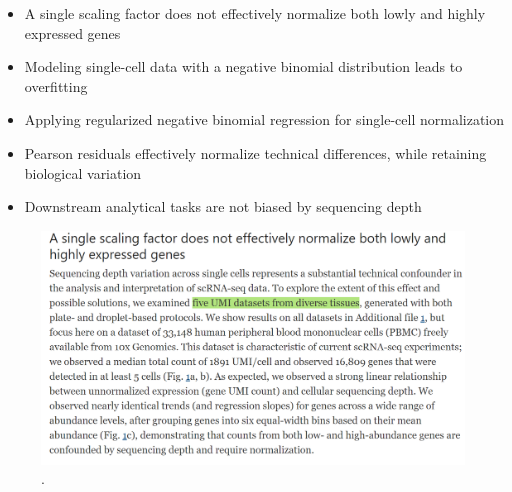 \documentclass[
]{book}
\begin{document}
\begin{itemize}
\item
  A single scaling factor does not effectively normalize both lowly and highly expressed genes
\item
  Modeling single-cell data with a negative binomial distribution leads to overfitting
\item
  Applying regularized negative binomial regression for single-cell normalization
\item
  Pearson residuals effectively normalize technical differences, while retaining biological variation
\item
  Downstream analytical tasks are not biased by sequencing depth
\end{itemize}

\begin{figure}
\centering
\includegraphics{./figs/RNAseqCounts/sctransform-sequencing depth.png}
\caption{.}
\end{figure}
\end{document}
